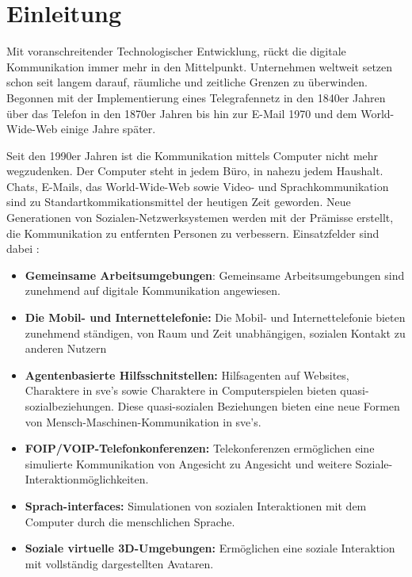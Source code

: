 \documentclass[a4paper,11pt]{article}%
\renewcommand{\\}{\vspace*{0.5\baselineskip} \newline}
\begin{document}
	
\section*{Einleitung}
	Mit voranschreitender Technologischer Entwicklung, rückt die digitale Kommunikation immer mehr in den Mittelpunkt. Unternehmen weltweit setzen schon seit langem darauf, räumliche und zeitliche Grenzen zu überwinden. Begonnen mit der Implementierung eines Telegrafennetz in den 1840er Jahren über das Telefon in den 1870er Jahren bis hin zur E-Mail 1970 und dem World-Wide-Web einige Jahre später.
	
	Seit den 1990er Jahren ist die Kommunikation mittels Computer nicht mehr wegzudenken. Der Computer steht in jedem Büro, in nahezu jedem Haushalt. Chats, E-Mails, das World-Wide-Web sowie Video- und Sprachkommunikation sind zu Standartkommikationsmittel der heutigen Zeit geworden. \citep[p. 14-16]{thurlow2004computer} \\ 
Neue Generationen von Sozialen-Netzwerksystemen werden mit der Prämisse erstellt, die Kommunikation zu entfernten Personen zu verbessern.
Einsatzfelder sind dabei :
\begin{itemize}
	\item{\textbf{Gemeinsame Arbeitsumgebungen}: Gemeinsame Arbeitsumgebungen sind zunehmend auf digitale Kommunikation angewiesen.}
	\item{\textbf{Die Mobil- und Internettelefonie:} Die Mobil- und Internettelefonie bieten zunehmend ständigen, von Raum und Zeit unabhängigen, sozialen Kontakt zu anderen Nutzern}
	\item{\textbf{Agentenbasierte Hilfsschnitstellen:} Hilfsagenten auf Websites, Charaktere in \ac{sve}'s sowie Charaktere in Computerspielen bieten \flqq quasi\frqq-sozialbeziehungen. Diese \flqq quasi\frqq-sozialen Beziehungen bieten eine neue Formen von Mensch-Maschinen-Kommunikation in \ac{sve}'s.} 
	\item{\textbf{FOIP/VOIP-Telefonkonferenzen:} Telekonferenzen ermöglichen eine simulierte Kommunikation von Angesicht zu Angesicht und weitere Soziale-Interaktionmöglichkeiten.}
	\item{\textbf{Sprach-interfaces:} Simulationen von sozialen Interaktionen mit dem Computer durch die menschlichen Sprache.}
	\item{\textbf{Soziale virtuelle 3D-Umgebungen:} Ermöglichen eine soziale Interaktion mit vollständig dargestellten Avataren.}
\end{itemize}
\end{document}
